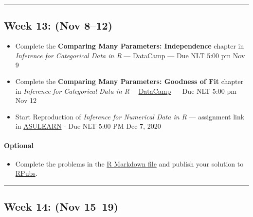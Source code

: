\documentclass[
]{article}
\providecommand{\tightlist}{%
  \setlength{\itemsep}{0pt}\setlength{\parskip}{0pt}}
\begin{document}
\begin{center}\rule{0.5\linewidth}{0.5pt}\end{center}

\hypertarget{week-13-nov-812}{%
\subsection*{Week 13: (Nov 8--12)}\label{week-13-nov-812}}

\begin{itemize}
\item
  Complete the \textbf{Comparing Many Parameters: Independence} chapter
  in \emph{Inference for Categorical Data in R} ---
  \href{https://app.datacamp.com/groups/stt3850-fall2021/assignments}{DataCamp}
  --- Due NLT 5:00 pm Nov 9
\item
  Complete the \textbf{Comparing Many Parameters: Goodness of Fit}
  chapter in \emph{Inference for Categorical Data in R}---
  \href{https://app.datacamp.com/groups/stt3850-fall2021/assignments}{DataCamp}
  --- Due NLT 5:00 pm Nov 12
\item
  Start Reproduction of \emph{Inference for Numerical Data in R} ---
  assignment link in
  \href{https://asulearn.appstate.edu/course/view.php?id=131169}{ASULEARN}
  - Due NLT 5:00 PM Dec 7, 2020
\end{itemize}

\begin{rmdoptional}
\hypertarget{optional}{%
\paragraph*{Optional}\label{optional}}

\begin{itemize}
\tightlist
\item
  Complete the problems in the
  \href{https://raw.githubusercontent.com/alanarnholt/STT3850/gh-pages/Homework/Chapter5HWK.Rmd}{R
  Markdown file} and publish your solution to
  \href{http://rpubs.com/}{RPubs}.
\end{itemize}
\end{rmdoptional}

\begin{center}\rule{0.5\linewidth}{0.5pt}\end{center}

\hypertarget{week-14-nov-1519}{%
\subsection*{Week 14: (Nov 15--19)}\label{week-14-nov-1519}}
\end{document}
